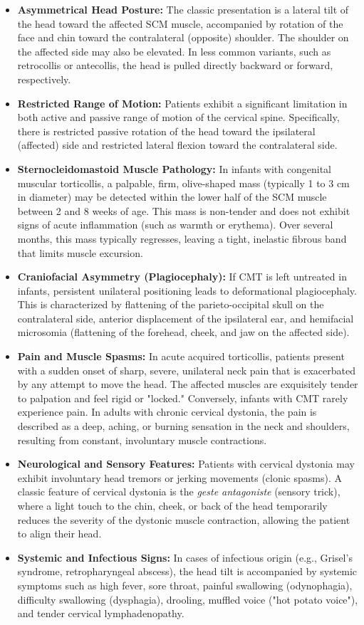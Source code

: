 \begin{itemize}
    \item \textbf{Asymmetrical Head Posture:} The classic presentation is a lateral tilt of the head toward the affected SCM muscle, accompanied by rotation of the face and chin toward the contralateral (opposite) shoulder. The shoulder on the affected side may also be elevated. In less common variants, such as retrocollis or antecollis, the head is pulled directly backward or forward, respectively.
    \item \textbf{Restricted Range of Motion:} Patients exhibit a significant limitation in both active and passive range of motion of the cervical spine. Specifically, there is restricted passive rotation of the head toward the ipsilateral (affected) side and restricted lateral flexion toward the contralateral side.
    \item \textbf{Sternocleidomastoid Muscle Pathology:} In infants with congenital muscular torticollis, a palpable, firm, olive-shaped mass (typically 1 to 3 cm in diameter) may be detected within the lower half of the SCM muscle between 2 and 8 weeks of age. This mass is non-tender and does not exhibit signs of acute inflammation (such as warmth or erythema). Over several months, this mass typically regresses, leaving a tight, inelastic fibrous band that limits muscle excursion.
    \item \textbf{Craniofacial Asymmetry (Plagiocephaly):} If CMT is left untreated in infants, persistent unilateral positioning leads to deformational plagiocephaly. This is characterized by flattening of the parieto-occipital skull on the contralateral side, anterior displacement of the ipsilateral ear, and hemifacial microsomia (flattening of the forehead, cheek, and jaw on the affected side).
    \item \textbf{Pain and Muscle Spasms:} In acute acquired torticollis, patients present with a sudden onset of sharp, severe, unilateral neck pain that is exacerbated by any attempt to move the head. The affected muscles are exquisitely tender to palpation and feel rigid or "locked." Conversely, infants with CMT rarely experience pain. In adults with chronic cervical dystonia, the pain is described as a deep, aching, or burning sensation in the neck and shoulders, resulting from constant, involuntary muscle contractions.
    \item \textbf{Neurological and Sensory Features:} Patients with cervical dystonia may exhibit involuntary head tremors or jerking movements (clonic spasms). A classic feature of cervical dystonia is the \textit{geste antagoniste} (sensory trick), where a light touch to the chin, cheek, or back of the head temporarily reduces the severity of the dystonic muscle contraction, allowing the patient to align their head.
    \item \textbf{Systemic and Infectious Signs:} In cases of infectious origin (e.g., Grisel's syndrome, retropharyngeal abscess), the head tilt is accompanied by systemic symptoms such as high fever, sore throat, painful swallowing (odynophagia), difficulty swallowing (dysphagia), drooling, muffled voice ("hot potato voice"), and tender cervical lymphadenopathy.
\end{itemize}

